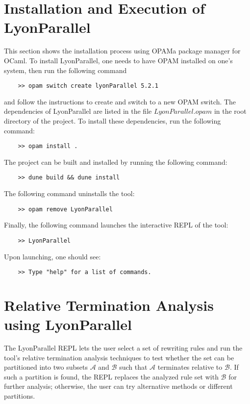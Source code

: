 \section{Installation and Execution of LyonParallel}
\label{lyonparallel:sec:installation}
This section shows the installation process using \colorbox{Ivory2}{OPAM}\textemdash{}a package manager for OCaml. To install LyonParallel, one needs to have \colorbox{Ivory2}{OPAM} installed on one's system, then 
run the following command
\begin{verbatim}
    >> opam switch create lyonParallel 5.2.1
\end{verbatim}
 and follow the instructions to create and switch to a new \colorbox{Ivory2}{OPAM} switch. 
 The dependencies of LyonParallel are listed in the file \colorbox{Ivory2}{$LyonParallel.opam$} in the root directory of the project. To install these dependencies, run the following command:
\begin{verbatim}
    >> opam install .
\end{verbatim}
The project can be built and installed by running the following command:
\begin{verbatim}
    >> dune build && dune install
\end{verbatim}
The following command uninstalls the tool:
\begin{verbatim}
    >> opam remove LyonParallel
\end{verbatim}
Finally, the following command launches the interactive REPL of the tool:
\begin{verbatim}
    >> LyonParallel
\end{verbatim}
Upon launching, one should see:
\begin{verbatim}
    >> Type "help" for a list of commands.
\end{verbatim}
\section{Relative Termination Analysis using LyonParallel}
\label{lyonparallel:sec:termination}
The LyonParallel REPL lets the user select a set of rewriting rules and run the tool's relative termination analysis techniques to test whether the set can be partitioned into two subsets \(\mathcal{A}\) and \(\mathcal{B}\) such that \(\mathcal{A}\) terminates relative to \(\mathcal{B}\). If such a partition is found, the REPL replaces the analyzed rule set with \(\mathcal{B}\) for further analysis; otherwise, the user can try alternative methods or different partitions.

